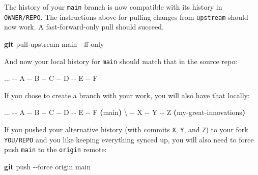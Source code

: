 \documentclass[
]{book}
\newenvironment{Shaded}{\begin{snugshade}}{\end{snugshade}}
\newcommand{\AttributeTok}[1]{\textcolor[rgb]{0.13,0.29,0.53}{#1}}
\newcommand{\DataTypeTok}[1]{\textcolor[rgb]{0.13,0.29,0.53}{#1}}
\newcommand{\ErrorTok}[1]{\textcolor[rgb]{0.64,0.00,0.00}{\textbf{#1}}}
\newcommand{\ExtensionTok}[1]{#1}
\newcommand{\FunctionTok}[1]{\textcolor[rgb]{0.13,0.29,0.53}{\textbf{#1}}}
\newcommand{\KeywordTok}[1]{\textcolor[rgb]{0.13,0.29,0.53}{\textbf{#1}}}
\newcommand{\NormalTok}[1]{#1}
\begin{document}
The history of your \texttt{main} branch is now compatible with its history in \texttt{OWNER/REPO}.
The instructions above for pulling changes from \texttt{upstream} should now work.
A fast-forward-only pull should succeed.

\begin{Shaded}
\begin{Highlighting}[]
\FunctionTok{git}\NormalTok{ pull upstream main }\AttributeTok{{-}{-}ff{-}only}
\end{Highlighting}
\end{Shaded}

And now your local history for \texttt{main} should match that in the source repo:

\begin{Shaded}
\begin{Highlighting}[]
\ExtensionTok{...} \AttributeTok{{-}{-}}\NormalTok{ A }\AttributeTok{{-}{-}}\NormalTok{ B }\AttributeTok{{-}{-}}\NormalTok{ C }\AttributeTok{{-}{-}}\NormalTok{ D }\AttributeTok{{-}{-}}\NormalTok{ E }\AttributeTok{{-}{-}}\NormalTok{ F}
\end{Highlighting}
\end{Shaded}

If you chose to create a branch with your work, you will also have that locally:

\begin{Shaded}
\begin{Highlighting}[]
\ExtensionTok{...} \AttributeTok{{-}{-}}\NormalTok{ A }\AttributeTok{{-}{-}}\NormalTok{ B }\AttributeTok{{-}{-}}\NormalTok{ C }\AttributeTok{{-}{-}}\NormalTok{ D }\AttributeTok{{-}{-}}\NormalTok{ E }\AttributeTok{{-}{-}}\NormalTok{ F }\ErrorTok{(}\ExtensionTok{main}\KeywordTok{)}
                   \DataTypeTok{\textbackslash{}}
                    \ExtensionTok{{-}{-}}\NormalTok{ X }\AttributeTok{{-}{-}}\NormalTok{ Y }\AttributeTok{{-}{-}}\NormalTok{ Z }\ErrorTok{(}\ExtensionTok{my{-}great{-}innovations}\KeywordTok{)}
\end{Highlighting}
\end{Shaded}

If you pushed your alternative history (with commits \texttt{X}, \texttt{Y}, and \texttt{Z}) to your fork \texttt{YOU/REPO} and you like keeping everything synced up, you will also need to force push \texttt{main} to the \texttt{origin} remote:

\begin{Shaded}
\begin{Highlighting}[]
\FunctionTok{git}\NormalTok{ push }\AttributeTok{{-}{-}force}\NormalTok{ origin main}
\end{Highlighting}
\end{Shaded}
\end{document}
